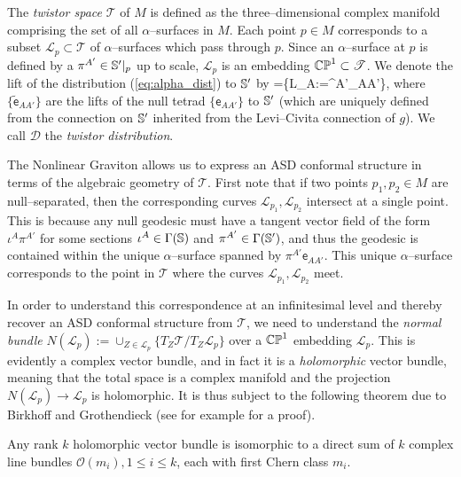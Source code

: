 The \textit{twistor space} $\mathscr{T}$ of $M$ is defined as the three--dimensional complex manifold comprising the set of all $\alpha$--surfaces in $M$. Each point $p\in M$ corresponds to a subset $\mathscr{L}_p\subset\mathscr{T}$ of $\alpha$--surfaces which pass through $p$. Since an $\alpha$--surface at $p$ is defined by a $\pi^{A'}\in\mathbb{S}'|_p$ up to scale, $\mathscr{L}_p$ is an embedding $\mathbb{CP}^1\subset\mathscr{T}$. We denote the lift of the distribution (\ref{eq:alpha_dist}) to $\mathbb{S}'$ by
\be \label{eq:twistor_dist}
=\{L_A:=\pi^{A'}_{AA'}\},
\ee
where $\{\tilde{\mathsf{e}}_{AA'}\}$ are the lifts of the null tetrad $\{\mathsf{e}_{AA'}\}$ to $\mathbb{S}'$ (which are uniquely defined from the connection on $\mathbb{S}'$ inherited from the Levi--Civita connection of $g$). We call $\mathcal{D}$ the \textit{twistor distribution}.

The Nonlinear Graviton allows us to express an ASD conformal structure in terms of the algebraic geometry of $\mathscr{T}$. First note that if two points $p_1,p_2\in M$ are null--separated, then the corresponding curves $\mathscr{L}_{p_1},\mathscr{L}_{p_2}$ intersect at a single point. This is because any null geodesic must have a tangent vector field of the form $\iota^A\pi^{A'}$ for some sections $\iota^A\in\Gamma(\mathbb{S})$ and $\pi^{A'}\in\Gamma(\mathbb{S}')$, and thus the geodesic is contained within the unique $\alpha$--surface spanned by $\pi^{A'}\mathsf{e}_{AA'}$. This unique $\alpha$--surface corresponds to the point in $\mathscr{T}$ where the curves $\mathscr{L}_{p_1},\mathscr{L}_{p_2}$ meet.

In order to understand this correspondence at an infinitesimal level and thereby recover an ASD conformal structure from $\mathscr{T}$, we need to understand the \textit{normal bundle} $N(\mathscr{L}_p):=\cup_{Z\in \mathscr{L}_p}\{T_Z\mathscr{T}/T_Z\mathscr{L}_p\}$ over a $\mathbb{CP}^1$ embedding $\mathscr{L}_p$. This is evidently a complex vector bundle, and in fact it is a \textit{holomorphic} vector bundle, meaning that the total space is a complex manifold and the projection $N(\mathscr{L}_p)\rightarrow\mathscr{L}_p$ is holomorphic. It is thus subject to the following theorem due to Birkhoff and Grothendieck (see for example \cite{complex_mfds} for a proof).
\begin{theo}
Any rank $k$ holomorphic vector bundle is isomorphic to a direct sum of $k$ complex line bundles $\mathcal{O}(m_i),1\leq i\leq k$, each with first Chern class $m_i$. 
\end{theo}

